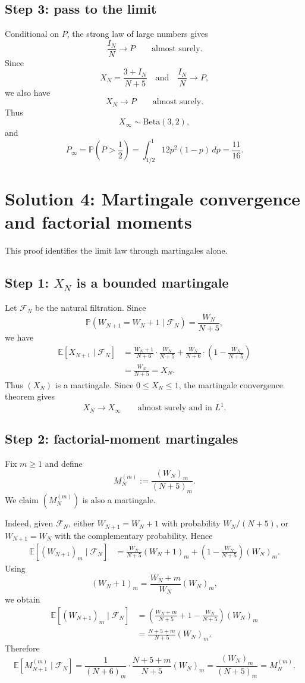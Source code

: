 \documentclass[12pt]{article}
\begin{document}
\subsection*{Step 3: pass to the limit}
Conditional on $P$, the strong law of large numbers gives
\[
\frac{I_N}{N}\longrightarrow P
\qquad\text{almost surely.}
\]
Since
\[
X_N=\frac{3+I_N}{N+5}
\quad\text{and}\quad
\frac{I_N}{N}\to P,
\]
we also have
\[
X_N\longrightarrow P
\qquad\text{almost surely.}
\]
Thus
\[
X_\infty\sim \mathrm{Beta}(3,2),
\]
and
\[
P_\infty
=
\mathbb{P}\!\left(P>\frac12\right)
=
\int_{1/2}^{1}12p^2(1-p)\,dp
=
\frac{11}{16}.
\]

\section{Solution 4: Martingale convergence and factorial moments}

This proof identifies the limit law through martingales alone.

\subsection*{Step 1: $X_N$ is a bounded martingale}
Let $\mathcal{F}_N$ be the natural filtration. Since
\[
\mathbb{P}(W_{N+1}=W_N+1\mid \mathcal{F}_N)=\frac{W_N}{N+5},
\]
we have
\begin{align*}
\mathbb{E}[X_{N+1}\mid \mathcal{F}_N]
&=
\frac{W_N+1}{N+6}\cdot \frac{W_N}{N+5}
+
\frac{W_N}{N+6}\cdot \left(1-\frac{W_N}{N+5}\right) \\
&=
\frac{W_N}{N+5}
=
X_N.
\end{align*}
Thus $(X_N)$ is a martingale. Since $0\le X_N\le 1$, the martingale convergence theorem gives
\[
X_N\longrightarrow X_\infty
\qquad\text{almost surely and in }L^1.
\]

\subsection*{Step 2: factorial-moment martingales}
Fix $m\ge 1$ and define
\[
M_N^{(m)}:=\frac{(W_N)_m}{(N+5)_m}.
\]
We claim $(M_N^{(m)})$ is also a martingale.

Indeed, given $\mathcal{F}_N$, either $W_{N+1}=W_N+1$ with probability $W_N/(N+5)$, or $W_{N+1}=W_N$ with the complementary probability. Hence
\begin{align*}
\mathbb{E}\!\left[(W_{N+1})_m\mid \mathcal{F}_N\right]
&=
\frac{W_N}{N+5}(W_N+1)_m
+
\left(1-\frac{W_N}{N+5}\right)(W_N)_m.
\end{align*}
Using
\[
(W_N+1)_m=\frac{W_N+m}{W_N}(W_N)_m,
\]
we obtain
\begin{align*}
\mathbb{E}\!\left[(W_{N+1})_m\mid \mathcal{F}_N\right]
&=
\left(
\frac{W_N+m}{N+5}
+
1-\frac{W_N}{N+5}
\right)(W_N)_m \\
&=
\frac{N+5+m}{N+5}(W_N)_m.
\end{align*}
Therefore
\[
\mathbb{E}[M_{N+1}^{(m)}\mid \mathcal{F}_N]
=
\frac{1}{(N+6)_m}\cdot \frac{N+5+m}{N+5}(W_N)_m
=
\frac{(W_N)_m}{(N+5)_m}
=
M_N^{(m)}.
\]
\end{document}
